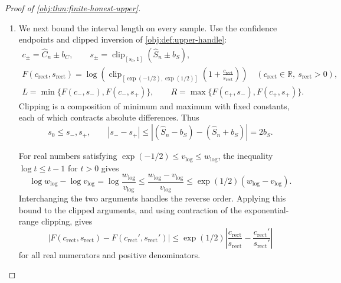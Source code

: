 \begin{proof}[Proof of \cref{obj:thm:finite-honest-upper}]
\begin{enumerate}
By \cref{obj:lem:observable-odds},
\[
C(P)=\{\exp(\theta(P))-1\}S(P),
\qquad S(P)\ge s_0.
\]
The product defining \(S(P)\) is at most one pointwise, so
\[
S(P)
=\int p_{10}(P,x)p_{01}(P,x)\,\lambda(dx)\le1,
\]
where the two conditional off-diagonal probabilities are
\[
p_{10}(P,x)=P(A=1,Y=0\mid X=x),
\qquad
p_{01}(P,x)=P(A=0,Y=1\mid X=x).
\]
Since \(|\theta(P)|\le1/2\), the exponential derivative is bounded by
\(\exp(1/2)\) on the segment between \(0\) and \(\theta(P)\). Therefore
\[
|\exp(\theta(P))-1|
\le\exp(1/2)|\theta(P)|,
\qquad
|C(P)|\le\exp(1/2)|\theta(P)|.
\]
In particular, for \(P\in\mathcal M_r(\alpha,\beta)\),
\[
\mathbb E_{P,n}|\widehat C_n|
\le\exp(1/2)r+b_C.
\]

\item We next bound the interval length on every sample. Use the confidence endpoints and clipped inversion of \cref{obj:def:upper-handle}:
\[
\begin{gathered}
c_\pm=\widehat C_n\pm b_C,
\qquad
s_\pm=\operatorname{clip}_{[s_0,1]}(\widehat S_n\pm b_S),\\
F(c_{\mathrm{rect}},s_{\mathrm{rect}})
=
\log\!\left(
\operatorname{clip}_{[\exp(-1/2),\exp(1/2)]}
\left(1+\frac{c_{\mathrm{rect}}}{s_{\mathrm{rect}}}\right)
\right)
\quad
(c_{\mathrm{rect}}\in\mathbb R,\ s_{\mathrm{rect}}>0),\\
L=\min\{F(c_-,s_-),F(c_-,s_+)\},
\qquad
R=\max\{F(c_+,s_-),F(c_+,s_+)\}.
\end{gathered}
\]
Clipping is a composition of minimum and maximum with fixed constants, each of which contracts absolute differences. Thus
\[
s_0\le s_-,s_+,
\qquad
|s_--s_+|
\le|(\widehat S_n-b_S)-(\widehat S_n+b_S)|
=2b_S.
\]

For real numbers satisfying
\(\exp(-1/2)\le v_{\log}\le w_{\log}\), the inequality
\(\log t\le t-1\) for \(t>0\) gives
\[
\log w_{\log}-\log v_{\log}
=
\log\frac{w_{\log}}{v_{\log}}
\le
\frac{w_{\log}-v_{\log}}{v_{\log}}
\le
\exp(1/2)(w_{\log}-v_{\log}).
\]
Interchanging the two arguments handles the reverse order. Applying this bound to the clipped arguments, and using contraction of the exponential-range clipping, gives
\[
\left|
F(c_{\mathrm{rect}},s_{\mathrm{rect}})
-
F(c_{\mathrm{rect}}',s_{\mathrm{rect}}')
\right|
\le
\exp(1/2)
\left|
\frac{c_{\mathrm{rect}}}{s_{\mathrm{rect}}}
-
\frac{c_{\mathrm{rect}}'}{s_{\mathrm{rect}}'}
\right|
\]
for all real numerators and positive denominators.


\end{enumerate}
\end{proof}
